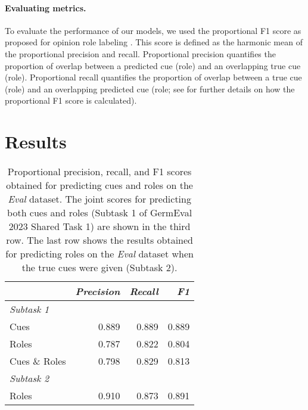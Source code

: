 \documentclass[11pt,a4paper]{article}
\begin{document}
\paragraph{Evaluating metrics.} To evaluate the performance of our models, we used the proportional F1 score as proposed for opinion role labeling \cite{Johansson2010}. This score is defined as the harmonic mean of the proportional precision and recall. Proportional precision quantifies the proportion of overlap between a predicted cue (role) and an overlapping true cue (role). Proportional recall quantifies the proportion of overlap between a true cue (role) and an overlapping predicted cue (role; see \cite{GermEval2023} for further details on how the proportional F1 score is calculated).



  
\section{Results}

\begin{table}
  \centering
  \begin{tabularx}{\linewidth}{Xrrr}
    \toprule
                  & \emph{Precision} & \emph{Recall} & \emph{F1} \\
    \midrule
    \multicolumn{4}{l}{\emph{Subtask 1}}                             \\
    Cues          & 0.889              & 0.889           & 0.889       \\
    Roles         & 0.787              & 0.822           & 0.804       \\
    Cues \& Roles & 0.798              & 0.829           & 0.813       \\
    \midrule
    \multicolumn{4}{l}{\emph{Subtask 2}}                             \\
    Roles         & 0.910              & 0.873           & 0.891       \\
    \bottomrule
  \end{tabularx}
  \caption{
    Proportional precision, recall, and F1 scores obtained for predicting cues and roles on the \emph{Eval} dataset.
    The joint scores for predicting both cues and roles (Subtask 1 of GermEval 2023 Shared Task 1) are shown in the third row.
    The last row shows the results obtained for predicting roles on the \emph{Eval} dataset when the true cues were given (Subtask 2).
  }
  \label{tab:f1scores}
\end{table}
\end{document}
